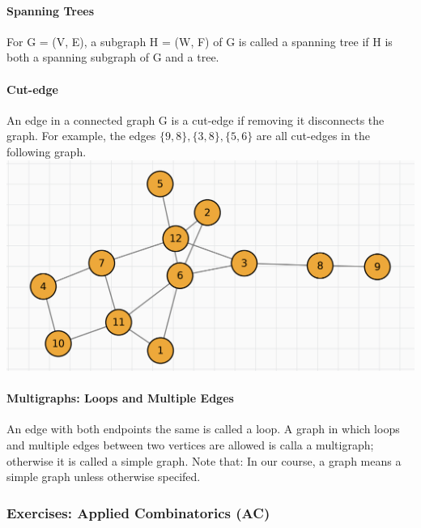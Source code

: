 \documentclass{article}
\begin{document}
\paragraph{Spanning Trees}
For G = (V, E), a subgraph H = (W, F) of G is called a spanning tree if H is both a spanning subgraph of G and a tree.
\paragraph{Cut-edge}
An edge in a connected graph G is a cut-edge if removing it disconnects the graph.\newline
For example, the edges $\{9, 8\}, \{3, 8\}, \{5, 6\}$ are all cut-edges in the following graph.\newline
\includegraphics{0035}
\paragraph{Multigraphs: Loops and Multiple Edges}
An edge with both endpoints the same is called a loop.\newline
A graph in which loops and multiple edges between two vertices are allowed is calla a multigraph; otherwise it is called a simple graph.\newline
Note that:  In our course, a graph means a simple graph unless otherwise specifed.
\subsubsection{Exercises: Applied Combinatorics (AC)}
\end{document}
